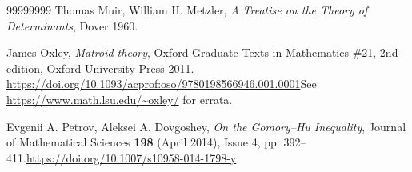 \documentclass[numbers=enddot,12pt,final,onecolumn,notitlepage]{scrartcl}%
\theoremstyle{definition}
\theoremstyle{plainsl}
\begin{document}
\begin{thebibliography}{99999999}
Thomas Muir, William H. Metzler, \textit{A Treatise on
the Theory of Determinants}, Dover 1960.

James Oxley, \textit{Matroid theory}, Oxford
Graduate Texts in Mathematics \#21, 2nd edition, Oxford University Press
2011.\newline%
\url{https://doi.org/10.1093/acprof:oso/9780198566946.001.0001}\newline See
\url{https://www.math.lsu.edu/~oxley/} for errata.

Evgenii A. Petrov, Aleksei A. Dovgoshey,
\textit{On the Gomory--Hu Inequality}, Journal of Mathematical Sciences
\textbf{198} (April 2014), Issue 4, pp. 392--411.\newline\url{https://doi.org/10.1007/s10958-014-1798-y}
\end{thebibliography}
\end{document}
